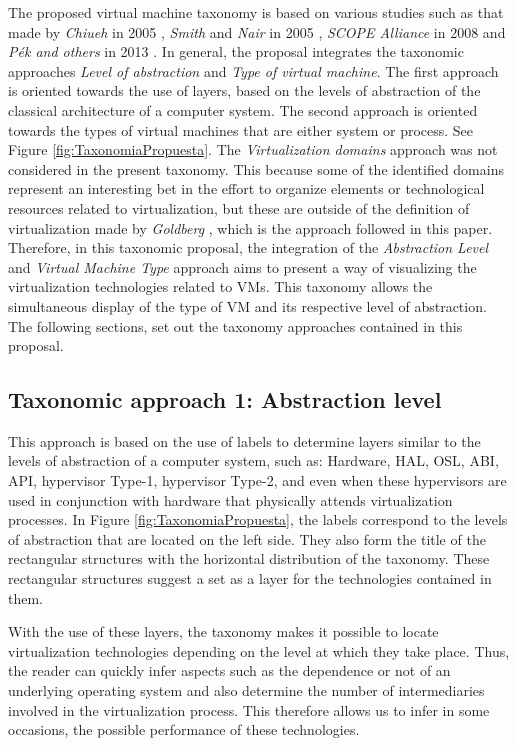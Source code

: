 	The proposed virtual machine taxonomy is based on various studies such as that made by \textit{Chiueh} in 2005 \cite{Chiueh2005}, \textit{Smith} and \textit{Nair} in 2005 \cite{Smith2005}, \textit{SCOPE Alliance} in 2008 \cite{SCOPEAlliance2008} and \textit{P{\'e}k and others} in 2013 \cite{Pek2013}. In general, the proposal integrates the taxonomic approaches \textit{Level of abstraction} and \textit{Type of virtual machine}. The first approach is oriented towards the use of layers, based on the levels of abstraction of the classical architecture of a computer system. The second approach is oriented towards the types of virtual machines that are either system or process. See Figure \ref{fig:TaxonomiaPropuesta}. The \textit{Virtualization domains} approach was not considered in the present taxonomy.  This because some of the identified domains represent an interesting bet in the effort to organize elements or technological resources related to virtualization, but these are outside of the definition of virtualization made by \textit{Goldberg} \cite{Goldberg1973}, which is the approach followed in this paper. Therefore, in this taxonomic proposal, the integration of the \textit{Abstraction Level} and \textit{Virtual Machine Type} approach aims to present a way of visualizing the virtualization technologies related to VMs. This taxonomy allows the simultaneous display of the type of VM and its respective level of abstraction. The following sections, set out the taxonomy approaches contained in this proposal.
	
	\subsection{Taxonomic approach 1: Abstraction level}

	This approach is based on the use of labels to determine layers similar to the levels of abstraction of a computer system, such as: Hardware, HAL, OSL, ABI, API, hypervisor Type-1, hypervisor Type-2, and even when these hypervisors are used in conjunction with hardware that physically attends virtualization processes. In Figure \ref{fig:TaxonomiaPropuesta}, the labels correspond to the levels of abstraction that are located on the left side. They also form the title of the rectangular structures with the horizontal distribution of the taxonomy. These rectangular structures suggest a set as a layer for the technologies contained in them.
	
	With the use of these layers, the taxonomy makes it possible to locate virtualization technologies depending on the level at which they take place. Thus, the reader can quickly infer aspects such as the dependence or not of an underlying operating system and also determine the number of intermediaries involved in the virtualization process. This therefore allows us to infer in some occasions, the possible performance of these technologies.
	
